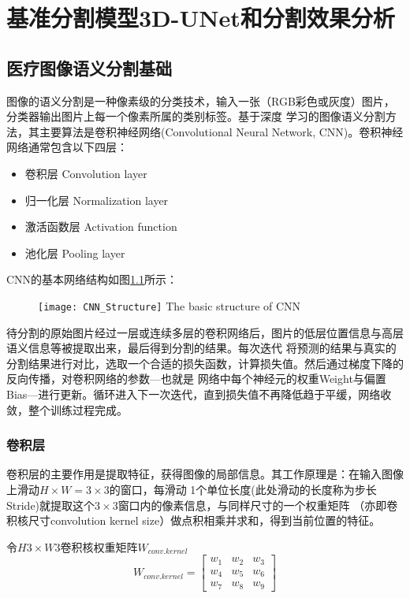 
\chapter{基准分割模型3D-UNet和分割效果分析}

\section{医疗图像语义分割基础}

图像的语义分割是一种像素级的分类技术，输入一张（RGB彩色或灰度）图片，分类器输出图片上每一个像素所属的类别标签。基于深度
学习的图像语义分割方法，其主要算法是卷积神经网络(Convolutional Neural Network, CNN)。卷积神经网络通常包含以下四层：
\begin{itemize}
    \item 卷积层 Convolution layer
    \item 归一化层 Normalization layer
    \item 激活函数层 Activation function
    \item 池化层 Pooling layer
\end{itemize}
CNN的基本网络结构如图\ref{fig:CNN_basic_structure}所示：
\begin{figure}[!htp]
    \centering
    \texttt{[image: CNN\_Structure]}
        {The basic structure of CNN}
    \label{fig:CNN_basic_structure}
\end{figure}

\noindent{}待分割的原始图片经过一层或连续多层的卷积网络后，图片的低层位置信息与高层语义信息等被提取出来，最后得到分割的结果。每次迭代
将预测的结果与真实的分割结果进行对比，选取一个合适的损失函数，计算损失值。然后通过梯度下降的反向传播，对卷积网络的参数---也就是
网络中每个神经元的权重Weight与偏置Bias---进行更新。循环进入下一次迭代，直到损失值不再降低趋于平缓，网络收敛，整个训练过程完成。

\subsection{卷积层}
卷积层的主要作用是提取特征，获得图像的局部信息。其工作原理是：在输入图像上滑动$H \times W = 3 \times 3$的窗口，每滑动
1个单位长度(此处滑动的长度称为步长Stride)就提取这个$3 \times 3$窗口内的像素信息，与同样尺寸的一个权重矩阵
（亦即卷积核尺寸convolution kernel size）做点积相乘并求和，得到当前位置的特征。

令$H3 \times W3$卷积核权重矩阵$W_{conv.kernel}$
\begin{equation}
    W_{conv.kernel} = \begin{bmatrix}
        w_1 & w_2 & w_3 \\
        w_4 & w_5 & w_6 \\
        w_7 & w_8 & w_9
    \end{bmatrix}
\end{equation}

